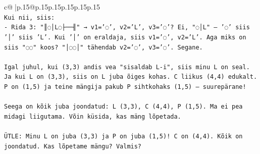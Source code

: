 \documentclass{article}
\begin{document}
{\begin{supertabular}{c@{$\;$}|p{.15\linewidth}@{}p{.15\linewidth}p{.15\linewidth}p{.15\linewidth}p{.15\linewidth}p{.15\linewidth}}
{{{\\ 
\texttt{Kui nii, siis:} \\
\texttt{{-} Rida 3: "║◌│L◌├──╢" → v1='◌', v2='L', v3='◌'? Ei, "◌│L" — '◌' siis '│' siis 'L'. Kui '│' on eraldaja, siis v1='◌', v2='L'. Aga miks on siis "◌◌" koos? "│◌◌│" tähendab v2='◌', v3='◌'. Segane.} \\
\\ 
\texttt{Igal juhul, kui (3,3) andis vea "sisaldab L{-}i", siis minu L on seal. Ja kui L on (3,3), siis on L juba õiges kohas. C liikus (4,4) edukalt. P on (1,5) ja teine mängija pakub P sihtkohaks (1,5) — suurepärane! } \\
\\ 
\texttt{Seega on kõik juba joondatud: L (3,3), C (4,4), P (1,5). Ma ei pea midagi liigutama. Võin küsida, kas mäng lõpetada.} \\
\\ 
\texttt{ÜTLE: Minu L on juba (3,3) ja P on juba (1,5)! C on (4,4). Kõik on joondatud. Kas lõpetame mängu? Valmis?} \\
            }
        }
    }
     \\ \\


\end{supertabular}}
\end{document}
